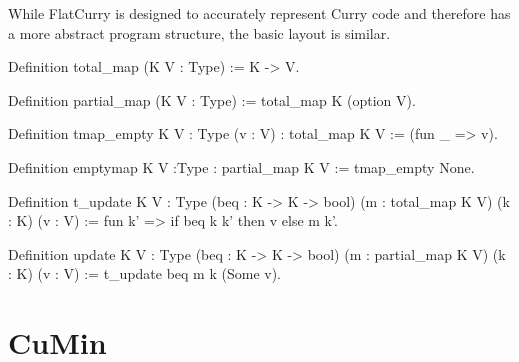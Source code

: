 \documentclass[fleqn]{scrreprt}
\begin{document}
\par
While FlatCurry is designed to accurately represent Curry code and therefore has a more abstract program structure, the basic layout is similar. 
\begin{coqcode}
Definition total_map (K V : Type) := K -> V.

Definition partial_map (K V : Type) := total_map K (option V).

Definition tmap_empty {K V : Type} (v : V) : total_map K V := (fun _ => v).

Definition emptymap {K V :Type} : partial_map K V := tmap_empty None.

Definition t_update {K V : Type} (beq : K -> K -> bool) (m : total_map K V) (k : K) (v : V) :=
fun k' => if beq k k' then v else m k'.

Definition update {K V : Type} (beq : K -> K -> bool) (m : partial_map K V) (k : K) (v : V) :=
t_update beq m k (Some v).
\end{coqcode}
\chapter{CuMin}
\end{document}
